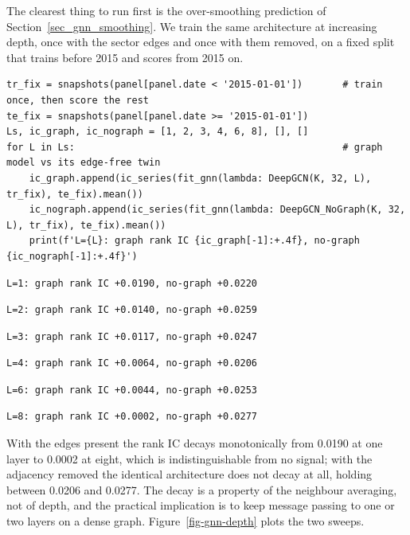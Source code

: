 The clearest thing to run first is the over-smoothing prediction of Section~\ref{sec_gnn_smoothing}. We train the same architecture at increasing depth, once with the sector edges and once with them removed, on a fixed split that trains before 2015 and scores from 2015 on.

\begin{verbatim}
tr_fix = snapshots(panel[panel.date < '2015-01-01'])       # train once, then score the rest
te_fix = snapshots(panel[panel.date >= '2015-01-01'])
Ls, ic_graph, ic_nograph = [1, 2, 3, 4, 6, 8], [], []
for L in Ls:                                               # graph model vs its edge-free twin
    ic_graph.append(ic_series(fit_gnn(lambda: DeepGCN(K, 32, L), tr_fix), te_fix).mean())
    ic_nograph.append(ic_series(fit_gnn(lambda: DeepGCN_NoGraph(K, 32, L), tr_fix), te_fix).mean())
    print(f'L={L}: graph rank IC {ic_graph[-1]:+.4f}, no-graph {ic_nograph[-1]:+.4f}')
\end{verbatim}

\begin{verbatim}
L=1: graph rank IC +0.0190, no-graph +0.0220
\end{verbatim}

\begin{verbatim}
L=2: graph rank IC +0.0140, no-graph +0.0259
\end{verbatim}

\begin{verbatim}
L=3: graph rank IC +0.0117, no-graph +0.0247
\end{verbatim}

\begin{verbatim}
L=4: graph rank IC +0.0064, no-graph +0.0206
\end{verbatim}

\begin{verbatim}
L=6: graph rank IC +0.0044, no-graph +0.0253
\end{verbatim}

\begin{verbatim}
L=8: graph rank IC +0.0002, no-graph +0.0277
\end{verbatim}

With the edges present the rank IC decays monotonically from 0.0190 at one layer to 0.0002 at eight, which is indistinguishable from no signal; with the adjacency removed the identical architecture does not decay at all, holding between 0.0206 and 0.0277. The decay is a property of the neighbour averaging, not of depth, and the practical implication is to keep message passing to one or two layers on a dense graph. Figure~\ref{fig-gnn-depth} plots the two sweeps.


